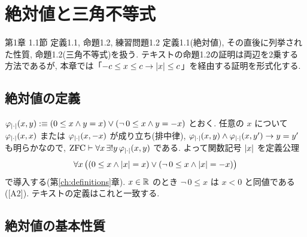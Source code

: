 \chapter{絶対値と三角不等式}\label{ch:text1}

\begin{textref}{第1章 1.1節 定義1.1, 命題1.2, 練習問題1.2}
  定義1.1(絶対値), その直後に列挙された性質, 命題1.2(三角不等式)を扱う. テキストの命題1.2の証明は両辺を2乗する方法であるが, 本章では「$-c \leq x \leq c \to \lvert x\rvert \leq c$」を経由する証明を形式化する.
\end{textref}

\section{絶対値の定義}

\begin{dfn}[テキスト定義1.1]\label{dfn:abs}
  $\varphi_{\lvert \cdot\rvert}(x, y) :\equiv (0 \leq x \land y = x) \lor (\neg\, 0 \leq x \land y = -x)$ とおく. 任意の $x$ について $\varphi_{\lvert \cdot\rvert}(x, x)$ または $\varphi_{\lvert \cdot\rvert}(x, -x)$ が成り立ち(排中律), $\varphi_{\lvert \cdot\rvert}(x, y) \land \varphi_{\lvert \cdot\rvert}(x, y') \to y = y'$ も明らかなので, $\mathrm{ZFC} \vdash \forall x\,\exists ! y\,\varphi_{\lvert \cdot\rvert}(x, y)$ である. よって関数記号 $\lvert x\rvert$ を定義公理
  \[ \forall x\,\bigl((0 \leq x \land \lvert x\rvert = x) \lor (\neg\, 0 \leq x \land \lvert x\rvert = -x)\bigr) \]
  で導入する(第\ref{ch:definitions}章). $x \in \mathbb{R}$ のとき $\neg\, 0 \leq x$ は $x < 0$ と同値である([A2]). テキストの定義はこれと一致する.
\end{dfn}

\section{絶対値の基本性質}

